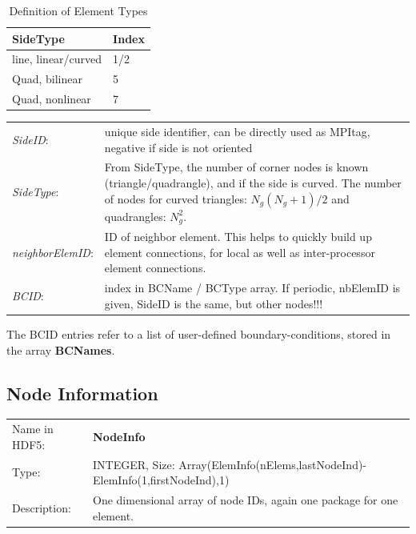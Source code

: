 \begin{table}[h!]
\centering
\begin{tabularx}{0.5\textwidth}{|X|l|} \hline
SideType         &Index   \\ \hline
line, linear/curved & 1/2 \\
 Quad, bilinear     & 5   \\
 Quad, nonlinear    & 7   \\ \hline
\end{tabularx}

\caption{Definition of Element Types}
\end{table}
\begin{table}[h!]
\begin{tabularx}{1.0\textwidth}{lX}
\emph{SideID}:          & unique side identifier, can be directly used as MPItag, negative if side is not oriented \\
\emph{SideType}:        & From SideType, the number of corner nodes is known (triangle/quadrangle), and if the side is curved. The number of nodes for curved triangles: $N_g(N_g+1)/2$ and quadrangles: $N_g^2$. \\
\emph{neighborElemID}:  & ID of neighbor element. This helps to quickly build up element connections, for local as well as inter-processor element connections. \\
\emph{BCID}:            & index in BCName / BCType array. If periodic, nbElemID is given, SideID is the same, but other nodes!!! 
\end{tabularx}
\end{table}

The BCID entries refer to a list of user-defined boundary-conditions, stored in the array \textbf{BCNames}. 

\newpage

\subsection{Node Information}

\begin{table}[h!]
\begin{tabularx}{1.0\textwidth}{lX}
Name in HDF5: & \textbf{NodeInfo}\\
Type:         & INTEGER, Size: Array(ElemInfo(nElems,lastNodeInd)-ElemInfo(1,firstNodeInd),1) \\
Description:  & One dimensional array of node IDs, again one package for one element.   \\
\end{tabularx}
\end{table}

